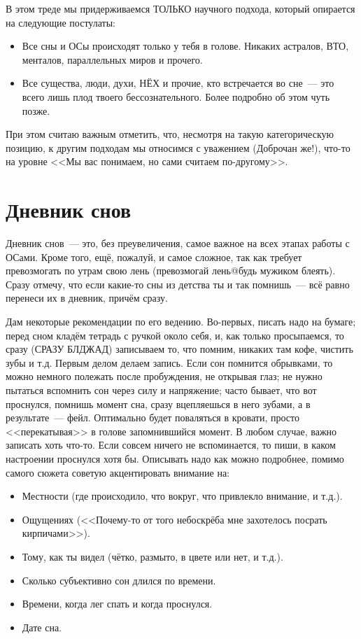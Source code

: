 \documentclass[a5paper,12pt,twoside]{memoir}
\begin{document}
В этом треде мы придерживаемся ТОЛЬКО научного подхода, который опирается на следующие постулаты:
\begin{itemize}
\item Все сны и ОСы происходят только у тебя в голове. Никаких астралов, ВТО, менталов, параллельных миров и прочего. 
\item Все существа, люди, духи, НЁХ и прочие, кто встречается во сне~--- это всего лишь плод твоего бессознательного. Более подробно об этом чуть позже.
\end{itemize}

При этом считаю важным отметить, что, несмотря на такую категорическую позицию, к другим подходам мы относимся с уважением (Доброчан же!), что-то на уровне <<Мы вас понимаем, но сами считаем по-другому>>.


\section{Дневник снов}

Дневник снов~--- это, без преувеличения, самое важное на всех этапах работы с ОСами. Кроме того, ещё, пожалуй, и самое сложное, так как требует превозмогать по утрам свою лень (превозмогай лень@будь мужиком блеять).
Сразу отмечу, что если какие-то сны из детства ты и так помнишь~--- всё равно перенеси их в дневник, причём сразу. 

Дам некоторые рекомендации по его ведению. Во-первых, писать надо на бумаге; перед сном кладём тетрадь с ручкой около себя, и, как только просыпаемся, то сразу (СРАЗУ БЛДЖАД) записываем то, что помним, никаких там кофе, чистить зубы и т.д. Первым делом делаем запись. Если сон помнится обрывками, то можно немного полежать после пробуждения, не открывая глаз; не нужно пытаться вспомнить сон через силу и напряжение; часто бывает, что вот проснулся, помнишь момент сна, сразу вцепляешься в него зубами, а в результате~--- фейл. Оптимально будет поваляться в кровати, просто <<перекатывая>> в голове запомнившийся момент. В любом случае, важно записать хоть что-то. Если совсем ничего не вспоминается, то пиши, в каком настроении проснулся хотя бы.
Описывать надо как можно подробнее, помимо самого сюжета советую акцентировать внимание на:
\begin{itemize}
\item Местности (где происходило, что вокруг, что привлекло внимание, и т.д.).
\item Ощущениях (<<Почему-то от того небоскрёба мне захотелось посрать кирпичами>>).
\item Тому, как ты видел (чётко, размыто, в цвете или нет, и т.д.).
\item Сколько субъективно сон длился по времени.
\item Времени, когда лег спать и когда проснулся.
\item Дате сна.
\end{itemize}
\end{document}
